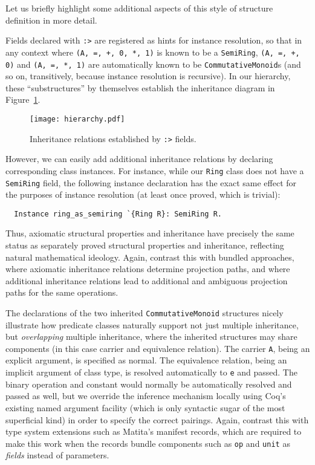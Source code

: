 \documentclass[a4paper,10pt,runningheads]{llncs}
\begin{document}
Let us briefly highlight some additional aspects of this style of structure definition in more detail.

Fields declared with \lstinline|:>| are registered as hints for instance resolution, so that in any context where \lstinline|(A, =, +, 0, *, 1)| is known to be a \lstinline|SemiRing|, \lstinline|(A, =, +, 0)| and \lstinline|(A, =, *, 1)| are automatically known to be \lstinline|CommutativeMonoid|s (and so on, transitively, because instance resolution is recursive). In our hierarchy, these ``substructures'' by themselves establish the inheritance diagram in Figure~\ref{inheritancediagram}. %

\begin{figure}
\label{inheritancediagram}
\centering
\texttt{[image: hierarchy.pdf]}
\caption{Inheritance relations established by \lstinline|:>| fields.}
\end{figure}

However, we can easily add additional inheritance relations by declaring corresponding class instances. For instance, while our \lstinline|Ring| class does not have a \lstinline|SemiRing| field, the following instance declaration has the exact same effect for the purposes of instance resolution (at least once proved, which is trivial):
\begin{lstlisting}
  Instance ring_as_semiring `{Ring R}: SemiRing R.
\end{lstlisting}

Thus, axiomatic structural properties and inheritance have precisely the same status as separately proved structural properties and inheritance, reflecting natural mathematical ideology. Again, contrast this with bundled approaches, where axiomatic inheritance relations determine projection paths, and where additional inheritance relations lead to additional and ambiguous projection paths for the same operations.


The declarations of the two inherited \lstinline|CommutativeMonoid| structures nicely illustrate how predicate classes naturally support not just multiple inheritance, but \emph{overlapping} multiple inheritance, where the inherited structures may share components (in this case carrier and equivalence relation). The carrier \lstinline|A|, being an explicit argument, is specified as normal. The equivalence relation, being an implicit argument of class type, is resolved automatically to \lstinline|e| and passed. The binary operation and constant would normally be automatically resolved and passed as well, but we override the inference mechanism locally using Coq's existing named argument facility (which is only syntactic sugar of the most superficial kind) in order to specify the correct pairings. 
Again, contrast this with type system extensions such as Matita's manifest records, which are required to make this work when the records bundle components such as \lstinline|op| and \lstinline{unit} as \emph{fields} instead of parameters.
\end{document}
